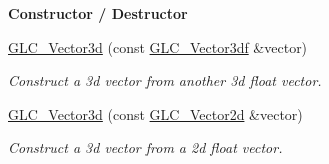 \begin{Indent}{\bf Constructor / Destructor}
\begin{DoxyCompactItemize}
\hyperlink{class_g_l_c___vector3d_aa8b12ed31cb9a21724bb1effd32ad1a4}{G\-L\-C\-\_\-\-Vector3d} (const \hyperlink{class_g_l_c___vector3df}{G\-L\-C\-\_\-\-Vector3df} \&vector)
\begin{DoxyCompactList}\small\item\em Construct a 3d vector from another 3d float vector. \end{DoxyCompactList}\item 
\hyperlink{class_g_l_c___vector3d_ac2ecb809e53fb1f3497acf67a2f97033}{G\-L\-C\-\_\-\-Vector3d} (const \hyperlink{class_g_l_c___vector2d}{G\-L\-C\-\_\-\-Vector2d} \&vector)
\begin{DoxyCompactList}\small\item\em Construct a 3d vector from a 2d float vector. \end{DoxyCompactList}\end{DoxyCompactItemize}
\end{Indent}
